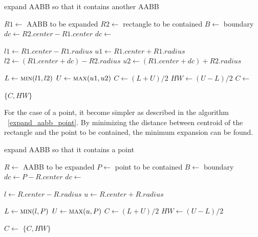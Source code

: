 \documentclass[10pt,letterpaper,twocolumn]{article}
\begin{document}
\begin{algorithm}[thb]
    \caption{expand AABB so that it contains another AABB}
    \label{expand_aabb_aabb}
    \begin{algorithmic}
        \State $R1 \gets$ AABB to be expanded
        \State $R2 \gets$ rectangle to be contained
        \State $B  \gets$ boundary
            \State $dc \gets R2.center - R1.center$
            \State $dc \gets$ 

            \State $l1 \gets R1.center - R1.radius$
            \State $u1 \gets R1.center + R1.radius$
            \State $l2 \gets (R1.center + dc) - R2.radius$
            \State $u2 \gets (R1.center + dc) + R2.radius$

            \State $L  \gets \Call{min}{l1, l2}$
            \State $U  \gets \Call{max}{u1, u2}$
            \State $C  \gets (L + U) / 2$
            \State $HW \gets (U - L) / 2$
            \State $C  \gets$ 

            \State \Return $\{C, HW\}$
        \EndFunction
     \end{algorithmic}
\end{algorithm}

For the case of a point, it become simpler as described in the algorithm
~\ref{expand_aabb_point}. By minimizing the distance between centroid of the
rectangle and the point to be contained, the minimum expansion can be found.

\begin{algorithm}[thb]
    \caption{expand AABB so that it contains a point}
    \label{expand_aabb_point}
    \begin{algorithmic}
        \State $R \gets$ AABB to be expanded
        \State $P \gets$ point to be contained
        \State $B \gets$ boundary
            \State $dc \gets P - R.center$
            \State $dc \gets$ 

            \State $l \gets R.center - R.radius$
            \State $u \gets R.center + R.radius$

            \State $L  \gets \Call{min}{l, P}$
            \State $U  \gets \Call{max}{u, P}$
            \State $C  \gets (L + U) / 2$
            \State $HW \gets (U - L) / 2$

            \State $C \gets$ 
            \State \Return $\{C, HW\}$
        \EndFunction
     \end{algorithmic}
\end{algorithm}
\end{document}
